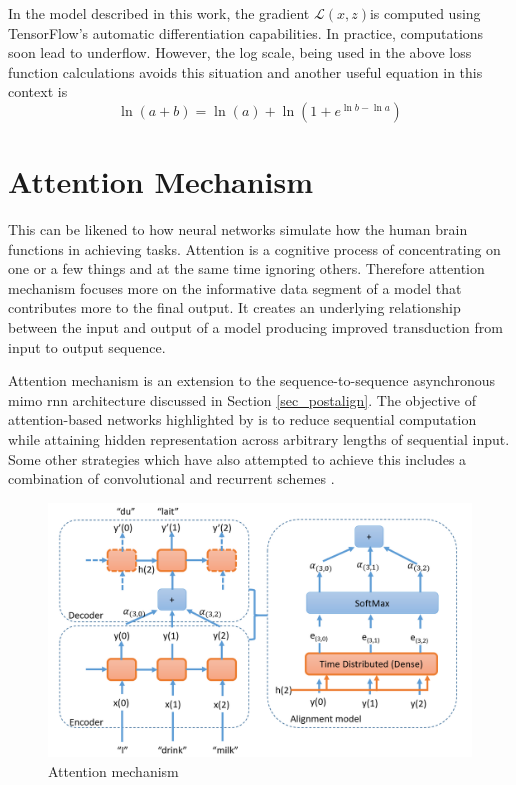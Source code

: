 In the model described in this work, the gradient $\mathcal{L}(x, z)$is computed using TensorFlow's automatic differentiation capabilities. In practice, computations soon lead to underflow.  However, the log scale, being used in the above loss function calculations avoids this situation and another useful equation in this context is
\begin{equation}
\ln(a + b) = \ln(a) + \ln(1 + e^{\ln b - \ln a})
\label{eqn_c3_ctc18}\end{equation}


\startblue
\section{Attention Mechanism}\label{sec_45_attn}

This can be likened to how neural networks simulate how the human brain functions in achieving tasks.   Attention is a cognitive process of concentrating on one or a few things and at the same time ignoring others.  Therefore attention mechanism focuses more on the informative data segment of a model that contributes more to the final output.  It creates an underlying relationship between the input and output of a model producing improved transduction from input to output sequence. 

Attention mechanism is an extension to the sequence-to-sequence asynchronous \acrshort{mimo} \acrshort{rnn} architecture discussed in Section \ref{sec_postalign}.  The objective of attention-based networks highlighted by \cite{vaswani2017attention} is to reduce sequential computation while attaining hidden representation across arbitrary lengths of sequential input. Some other strategies which have also attempted to achieve this includes a combination of convolutional and recurrent schemes \citep{kaiser2016can,kalchbrenner2016neural, gehring2017convolutional}.

\begin{figure}
\centering
  \includegraphics[width=12cm]{thesis/images/attention.PNG}
  \caption{Attention mechanism}
\label{fig_c4_attn}
\end{figure}

